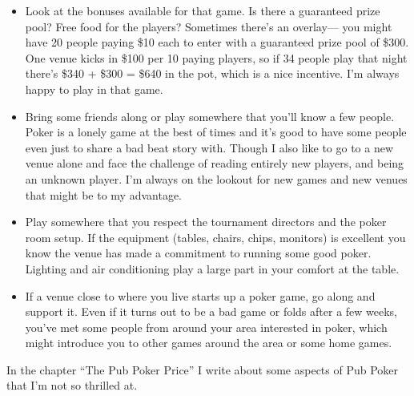 \begin{itemize}
\item Look at the bonuses available for that game. Is there a
guaranteed prize pool? Free food for the players? Sometimes
there's an overlay--- you might have 20 people paying \$10 each
to enter with a guaranteed prize pool of \$300. One venue kicks
in \$100 per 10 paying players, so if 34 people play that night
there's \$340 + \$300 = \$640 in the pot, which is a nice incentive.
I'm always happy to play in that game.

\item Bring some friends along or play somewhere that you'll
know a few people. Poker is a lonely game at the best
of times and it's good to have some people even just to share
a bad beat story with. Though I also like
to go to a new venue alone and face the challenge of
reading entirely new players, and being an unknown player.
I'm always on the lookout for new games and new venues that
might be to my advantage.

\item Play somewhere that you respect the tournament directors
and the poker room setup. If the equipment (tables, chairs, chips,
monitors) is excellent you know the venue has made a commitment
to running some good poker. Lighting and air conditioning
play a large part in your comfort at the table.

\item If a venue close to where you live starts
up a poker game, go along and support it. Even if it turns out to
be a bad game or folds after a few weeks, you've met some people
from around your area interested in poker, which might introduce
you to other games around the area or some home games.

\end{itemize}

In the chapter ``The Pub Poker Price'' I write about some
aspects of Pub Poker that I'm not so thrilled at.
